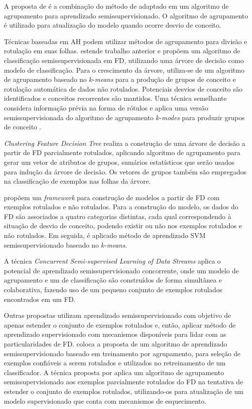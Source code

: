 A proposta de  é a combinação do método de \cite{Dasu2006} adaptado em um algoritmo de agrupamento para aprendizado semissupervisionado. O algoritmo de agrupamento é utilizado para atualização do modelo quando ocorre desvio de conceito.

Técnicas baseadas em AH podem utilizar métodos de agrupamento para divisão e rotulação em suas folhas.  estende trabalho anterior \cite{Li2010} e propõem um algoritmo de classificação semissupervisionada em FD, utilizando uma árvore de decisão como modelo de classificação. Para o crescimento da árvore, utiliza-se de um algoritmo de agrupamento baseado no $k$-\emph{means} para a produção de grupos de conceito e rotulação automática de dados não rotulados. Potenciais desvios de conceito são identificados e conceitos recorrentes são mantidos. Uma técnica semelhante considera informação prévia na forma de rótulos e aplica uma versão semissupervisionada do algoritmo de agrupamento $k$-\emph{modes} para produzir grupos de conceito \cite{Li2010a,wu2012}.

\emph{Clustering Feature Decision Tree} \cite{Xu2011} realiza a construção de uma árvore de decisão a partir de FD parcialmente rotulados, aplicando algoritmo de agrupamento para gerar um vetor de atributos de grupos, sumários estatísticos que serão usados para indução da árvore de decisão. Os vetores de grupos também são empregados na classificação de exemplos nas folhas da árvore.

 propõem um \emph{framework} para construção de modelos a partir de FD com exemplos rotulados e não rotulados. Para a construção do modelo, os dados do FD são associados a quatro categorias distintas, cada qual correspondendo à situação de desvio de conceito, podendo existir ou não nos exemplos rotulados e não rotulados. Em seguida, é aplicado método de aprendizado SVM semissupervisionado baseado no $k$-\emph{means}.

A técnica \emph{Concurrent Semi-supervised Learning of Data Streams} \cite{Nguyen2011,Nguyen2013} aplica o potencial de aprendizado semissupervisionado concorrente, onde um modelo de agrupamento e um de classificação são construídos de forma simultânea e colaborativa, fazendo uso de um pequeno conjunto de exemplos rotulados encontrados em um FD.

Outras propostas utilizam aprendizado semissupervisionado com objetivo de apenas estender o conjunto de exemplos rotulados e, então, aplicar método de aprendizado supervisionado com mecanismos disponíveis para lidar com as particularidades de FD.  coloca a proposta de um algoritmo de aprendizado semissupervisionado baseado em treinamento por agrupamento, para seleção de exemplos confiáveis a serem rotulados e utilizados no retreinamento de um classificador. A técnica proposta por \cite{Yu2009} aplica um algoritmo de agrupamento semissupervisionado aos exemplos parcialmente rotulados do FD na tentativa de estender o conjunto de exemplos rotulados, utilizando-os para atualização de um modelo supervisionado que conta com mecanismos de esquecimento.

